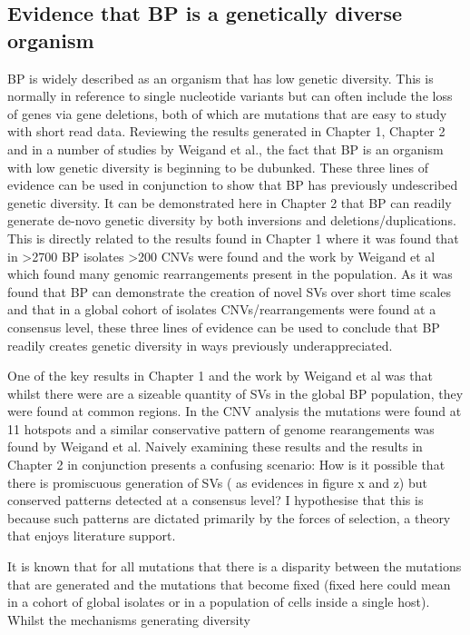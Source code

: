 \documentclass{article}
\begin{document}
\subsection{Evidence that BP is a genetically diverse organism}
BP is widely described as an organism that has low genetic diversity. This is normally in reference to single nucleotide variants but can often include the loss of genes via gene deletions, both of which are mutations that are easy to study with short read data. Reviewing the results generated in Chapter 1, Chapter 2 and in a number of studies by Weigand et al., the fact that BP is an organism with low genetic diversity is beginning to be dubunked. These three lines of evidence can be used in conjunction to show that BP has previously undescribed genetic diversity. It can be demonstrated here in Chapter 2 that BP can readily generate de-novo genetic diversity by both inversions and deletions/duplications. This is directly related to the results found in Chapter 1 where it was found that in >2700 BP isolates >200 CNVs were found and the work by Weigand et al which found many genomic rearrangements present in the population.  As it was found that BP can demonstrate the creation of novel SVs over short time scales and that in a global cohort of isolates CNVs/rearrangements were found at a consensus level, these three lines of evidence can be used to conclude that BP readily creates genetic diversity in ways previously underappreciated.

One of the key results in Chapter 1 and the work by Weigand et al was that whilst there were are a sizeable quantity of SVs in the global BP population, they were found at common regions. In the CNV analysis the mutations were found at 11 hotspots and a similar conservative pattern of genome rearangements was found by Weigand et al. Naively examining these results and the results in Chapter 2  in conjunction presents a confusing scenario: How is it possible that there is promiscuous generation of SVs ( as evidences in figure x and z) but conserved patterns detected at a consensus level? I hypothesise that this is because such patterns are dictated primarily by the forces of selection, a theory that enjoys literature support.

It is known that for all mutations that there is a disparity between the mutations that are generated and the mutations that become fixed (fixed here could mean in a cohort of global isolates or in a population of cells inside a single host). Whilst the mechanisms generating diversity 
\end{document}
